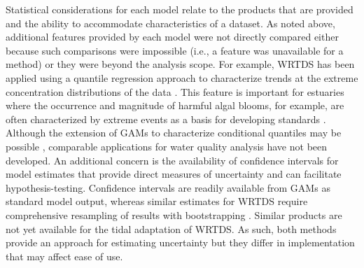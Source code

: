 \documentclass[letterpaper,12pt,oneside]{article}\usepackage[]{graphicx}\usepackage[]{color}
\begin{document}
Statistical considerations for each model relate to the products that are provided and the ability to accommodate characteristics of a dataset.  As noted above, additional features provided by each model were not directly compared either because such comparisons were impossible (i.e., a feature was unavailable for a method) or they were beyond the analysis scope.  For example, \ac{WRTDS} has been applied using a quantile regression approach to characterize trends at the extreme concentration distributions of the data \citep{Beck15}.  This feature is important for estuaries where the occurrence and magnitude of harmful algal blooms, for example, are often characterized by extreme events as a basis for developing standards \citep[e.g.,][]{Schaeffer13}. Although the extension of \acp{GAM} to characterize conditional quantiles may be possible \citep[e.g., additive quantile regression,][]{Koenker13}, comparable applications for water quality analysis have not been developed.  An additional concern is the availability of confidence intervals for model estimates that provide direct measures of uncertainty and can facilitate hypothesis-testing.  Confidence intervals are readily available from \acp{GAM} as standard model output, whereas similar estimates for \ac{WRTDS} require comprehensive resampling of results with bootstrapping \citep[available as the `EGRETci' package,][]{Hirsch15}.  Similar products are not yet available for the tidal adaptation of \ac{WRTDS}.  As such, both methods provide an approach for estimating uncertainty but they differ in implementation that may affect ease of use.  
\end{document}

